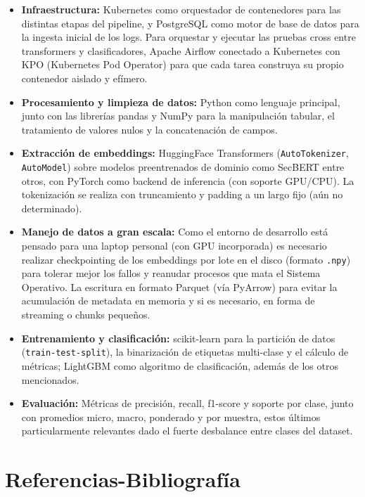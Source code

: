\documentclass[12pt]{article}
\begin{document}
\begin{itemize}

\item \textbf{Infraestructura:} Kubernetes como orquestador de contenedores para las distintas etapas del pipeline, y PostgreSQL como motor de base de datos para la ingesta inicial de los logs. Para orquestar y ejecutar las pruebas cross entre transformers y clasificadores, Apache Airflow conectado a Kubernetes con KPO (Kubernetes Pod Operator) para que cada tarea construya su propio contenedor aislado y efímero.

\item \textbf{Procesamiento y limpieza de datos:} Python como lenguaje principal, junto con las librerías pandas y NumPy para la manipulación tabular, el tratamiento de valores nulos y la concatenación de campos.

\item \textbf{Extracción de embeddings:} HuggingFace Transformers (\texttt{AutoTokenizer}, \texttt{AutoModel}) sobre modelos preentrenados de dominio como SecBERT \cite{jackaduma2022secbert} entre otros, con PyTorch \cite{paszke2019pytorch} como backend de inferencia (con soporte GPU/CPU). La tokenización se realiza con truncamiento y padding a un largo fijo (aún no determinado).

\item \textbf{Manejo de datos a gran escala:} Como el entorno de desarrollo está pensado para una laptop personal (con GPU incorporada) es necesario realizar checkpointing de los embeddings por lote en el disco (formato \texttt{.npy}) para tolerar mejor los fallos y reanudar procesos que mata el Sistema Operativo. La escritura en formato Parquet (vía PyArrow) para evitar la acumulación de metadata en memoria y si es necesario, en forma de streaming o chunks pequeños.

\item \textbf{Entrenamiento y clasificación:} scikit-learn para la partición de datos (\texttt{train-test-split}), la binarización de etiquetas multi-clase y el cálculo de métricas; LightGBM como algoritmo de clasificación, además de los otros mencionados.

\item \textbf{Evaluación:} Métricas de precisión, recall, f1-score y soporte por clase, junto con promedios micro, macro, ponderado y por muestra, estos últimos particularmente relevantes dado el fuerte desbalance entre clases del dataset.

\end{itemize}


\section{Referencias-Bibliografía}


\printbibliography[heading=none]
\end{document}
